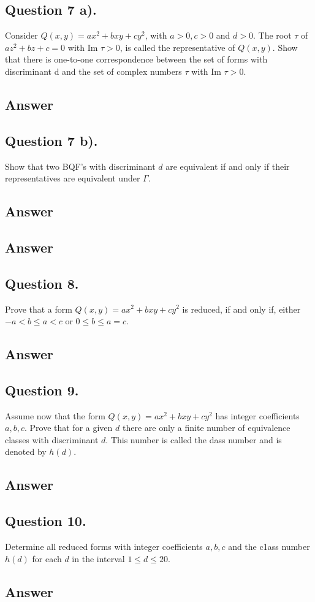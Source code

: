 \subsection{Question 7 a).}
\noindent
Consider $Q(x,y)=a x^2 + b x y +c y^2$, with $a>0, c>0$ and $d>0$. The root $\tau$ of $a z^2 + b z + c = 0$ with
Im $\tau > 0$, is called the representative of $Q(x,y)$. Show that there is one-to-one correspondence between the
set of forms with discriminant d and the set of complex numbers $\tau$ with Im $\tau > 0$.

\subsection*{Answer}
\noindent
[TBD]


\subsection{Question 7 b).}
\noindent
Show that two BQF's with discriminant $d$ are equivalent if and only if their representatives are equivalent under $\Gamma$.
\subsection*{Answer}
\noindent
[TBD]

\subsection*{Answer}
\noindent
[TBD]


\subsection{Question 8.}
\noindent
Prove that a form $Q(x,y) = a x^2 + b x y +c y^2$ is reduced, if and only if, either $-a < b \leq a < c$ or
$0 \leq b \leq a = c$.

\subsection*{Answer}
\noindent
[TBD]


\subsection{Question 9.}
\noindent
Assume now that the form $Q(x, y) = a x^2 + b x y + c y^2$ has integer coefficients $a, b, c$.
Prove that for a given $d$ there are only a finite number of equivalence classes  with discriminant $d$.
This number is called the dass number and is denoted by $h(d)$.

\subsection*{Answer}
\noindent
[TBD]


\subsection{Question 10.}
\noindent
Determine all reduced forms with integer coefficients $a, b, c$ and the c1ass number $h(d)$ for each $d$ in the
interval $1 \leq d \leq 20$.

\subsection*{Answer}
\noindent
[TBD]